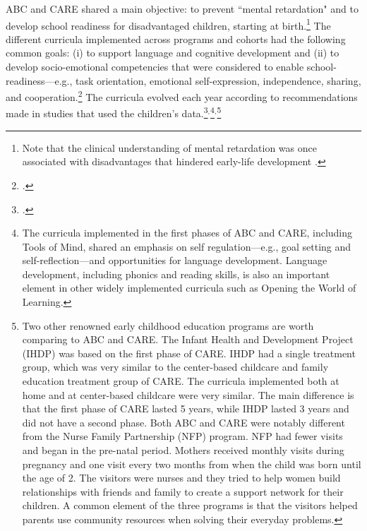 

\noindent ABC and CARE shared a main objective: to prevent ``mental retardation" and to develop school readiness for disadvantaged children, starting at birth.\footnote{Note that the clinical understanding of mental retardation was once associated with disadvantages that hindered early-life development \citep{Mental-Retardation_America_2004_BOOK_NYU}.} The different curricula implemented across programs and cohorts had the following common goals: (i) to support language and cognitive development and (ii) to develop socio-emotional competencies that were considered to enable school-readiness---e.g., task orientation, emotional self-expression, independence, sharing, and cooperation.\footnote{\citet{Sparling_1974_Synth_Edu_Infant_SPEECH,Ramey_Collier_etal_1976_CarolinaAbecedarianProject,Ramey-etal_2012-ABC}.} The curricula evolved each year according to recommendations made in studies that used the children's data.\footnote{\citet{Ramey-etal_1975_AJoMD,Finkelstein_1982_Day_Care_YC,Haskins_1985_CD}.}$^{,}$\footnote{The curricula implemented in the first phases of ABC and CARE, including Tools of Mind, shared an emphasis on self regulation---e.g., goal setting and self-reflection---and opportunities for language development. Language development, including phonics and reading skills, is also an important element in other widely implemented curricula such as Opening the World of Learning.}$^{,}$\footnote{Two other renowned early childhood education programs are worth comparing to ABC and CARE. The Infant Health and Development Project (IHDP) was based on the first phase of CARE. IHDP had a single treatment group, which was very similar to the center-based childcare and family education treatment group of CARE. The curricula implemented both at home and at center-based childcare were very similar. The main difference is that the first phase of CARE lasted 5 years, while IHDP lasted 3 years and did not have a second phase. Both ABC and CARE were notably different from the Nurse Family Partnership (NFP) program. NFP had fewer visits and began in the pre-natal period. Mothers received monthly visits during pregnancy and one visit every two months from when the child was born until the age of 2. The visitors were nurses and they tried to help women build relationships with friends and family to create a support network for their children. A common element of the three programs is that the visitors helped parents use community resources when solving their everyday problems.}\\


